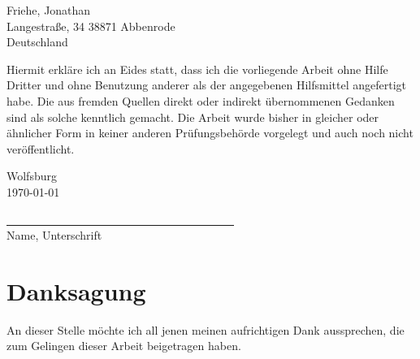 \newpage




\text{ }
\vspace{2.0cm}


Friehe, Jonathan\\
Langestraße, 34 38871 Abbenrode\\
Deutschland
\vspace{1.0cm}

\glqq Hiermit erkl\"are ich an Eides statt, dass ich die vorliegende Arbeit ohne Hilfe Dritter und ohne
Benutzung anderer als der angegebenen Hilfsmittel angefertigt habe. Die aus fremden Quellen
direkt oder indirekt \"ubernommenen Gedanken sind als solche kenntlich gemacht. Die Arbeit
wurde bisher in gleicher oder \"ahnlicher Form in keiner anderen Pr\"ufungsbeh\"orde vorgelegt
und auch noch nicht ver\"offentlicht.\grqq

Wolfsburg\\
\today
\medskip
\medskip



\underline{~~~~~~~~~~~~~~~~~~~~~~~~~~~~~~~~~~~~~~~~}\\
Name, Unterschrift



\newpage

\setcounter{page}{3}



\chapter*{Danksagung}

An dieser Stelle möchte ich all jenen meinen aufrichtigen Dank aussprechen, die zum Gelingen dieser Arbeit beigetragen haben.

